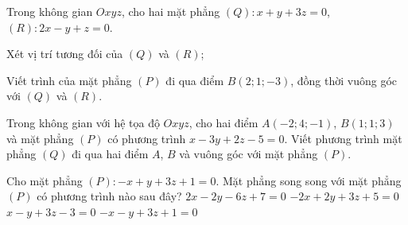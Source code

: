 
\begin{vd}%
	Trong không gian $Oxyz$, cho  hai mặt phẳng $(Q) \colon x+y+3z=0$, $(R) \colon  2x-y+z=0$.
	\begin{enumEX}[a)]{1}
		\item Xét vị trí tương đối của $(Q)$ và $(R)$;
		\item Viết trình của mặt phẳng $(P)$ đi qua điểm $B(2;1;-3)$, đồng thời vuông góc với $(Q)$ và $(R)$.
	\end{enumEX}
\end{vd}
\begin{vd}%
	Trong không gian với hệ tọa độ $Oxyz$, cho hai điểm $A(-2;4;-1)$, $B(1;1;3)$ và mặt phẳng $(P)$ có phương trình $x-3y+2z-5=0$. Viết phương trình mặt phẳng $(Q)$ đi qua hai điểm $A$, $B$ và vuông góc với mặt phẳng $(P)$.
\end{vd}


\begin{ex}%
	Cho mặt phẳng $(P)\colon -x+y+3z+1=0$. Mặt phẳng song song với mặt phẳng $(P)$ có phương trình nào sau đây?
	\choice
	{\True $2x-2y-6z+7=0$}
	{$-2x+2y+3z+5=0$}
	{$x-y+3z-3=0$}
	{$-x-y+3z+1=0$}
\end{ex}

